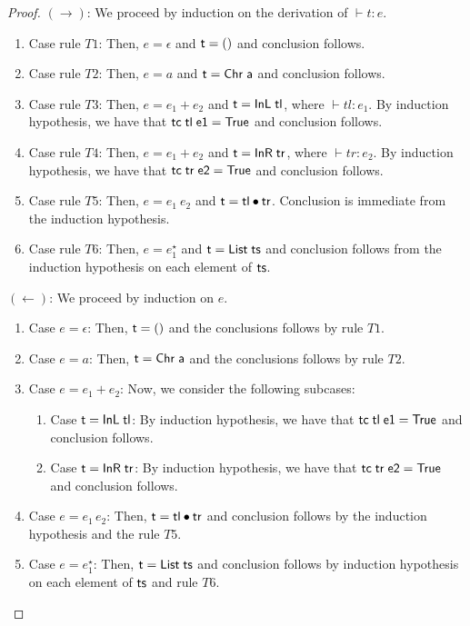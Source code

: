 \documentclass[sigplan]{acmart}
\theoremstyle{definition}
\newcommand{\C}[1]{\red{\mathsf{#1}}}
\newcommand{\F}[1]{\green{\mathsf{#1}}}
\newcommand{\V}[1]{\black{\mathsf{#1}}}
\begin{document}
\begin{proof}
  $(\to)$: We proceed by induction on the derivation of $\vdash t : e$.
  \begin{enumerate}
     \item Case rule $T1$: Then, $e = \epsilon$ and \ensuremath{\V{t}\mathrel{=}\C{()}} and conclusion follows.
     \item Case rule $T2$: Then, $e = a$ and \ensuremath{\V{t}\mathrel{=}\C{Chr}\;\V{a}} and conclusion follows.
     \item Case rule $T3$: Then, $e = e_1 + e_2$ and \ensuremath{\V{t}\mathrel{=}\C{InL}\;\V{tl}}, where $\vdash tl : e_1$.
           By induction hypothesis, we have that \ensuremath{\F{tc}\;\V{tl}\;\V{e1}\mathrel{=}\C{True}} and conclusion follows.
     \item Case rule $T4$: Then, $e = e_1 + e_2$ and \ensuremath{\V{t}\mathrel{=}\C{InR}\;\V{tr}}, where $\vdash tr : e_2$.
           By induction hypothesis, we have that \ensuremath{\F{tc}\;\V{tr}\;\V{e2}\mathrel{=}\C{True}} and conclusion follows.
     \item Case rule $T5$: Then, $e = e_1\:e_2$ and \ensuremath{\V{t}\mathrel{=}\V{tl}\C{\:\bullet\:}\V{tr}}. Conclusion is immediate
           from the induction hypothesis.
     \item Case rule $T6$: Then, $e = e_1^\star$ and \ensuremath{\V{t}\mathrel{=}\C{List}\;\V{ts}} and conclusion follows
           from the induction hypothesis on each element of \ensuremath{\V{ts}}.
  \end{enumerate}
  $(\leftarrow)$: We proceed by induction on $e$.
  \begin{enumerate}
     \item Case $e = \epsilon$: Then, \ensuremath{\V{t}\mathrel{=}\C{()}} and the conclusions follows by rule $T1$.
     \item Case $e = a$: Then, \ensuremath{\V{t}\mathrel{=}\C{Chr}\;\V{a}} and the conclusions follows by rule $T2$.
     \item Case $e = e_1 + e_2$: Now, we consider the following subcases:
     \begin{enumerate}
        \item Case \ensuremath{\V{t}\mathrel{=}\C{InL}\;\V{tl}}: By induction hypothesis, we have that \ensuremath{\F{tc}\;\V{tl}\;\V{e1}\mathrel{=}\C{True}} and conclusion follows.
        \item Case \ensuremath{\V{t}\mathrel{=}\C{InR}\;\V{tr}}: By induction hypothesis, we have that \ensuremath{\F{tc}\;\V{tr}\;\V{e2}\mathrel{=}\C{True}} and conclusion follows.
     \end{enumerate}
     \item Case $e = e_1\,e_2$: Then, \ensuremath{\V{t}\mathrel{=}\V{tl}\C{\:\bullet\:}\V{tr}} and conclusion follows by the induction
      hypothesis and the rule $T5$.
     \item Case $e = e_1^\star$: Then, \ensuremath{\V{t}\mathrel{=}\C{List}\;\V{ts}} and conclusion follows by induction hypothesis
      on each element of \ensuremath{\V{ts}} and rule $T6$.
  \end{enumerate}
\end{proof}
\end{document}
